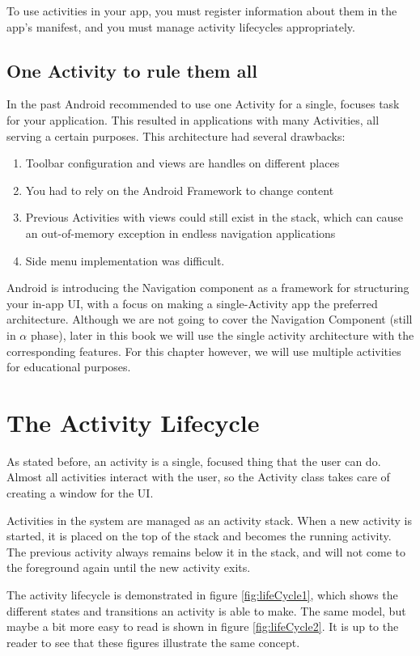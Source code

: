 To use activities in your app, you must register information about them in the app’s manifest, and you must manage activity lifecycles appropriately.

\subsection{One Activity to rule them all}
\label{sec:oneactivity}
In the past Android recommended to use one Activity for a single, focuses task for your application.
This resulted in applications with many Activities, all serving a certain purposes.
This architecture had several drawbacks:

\begin{enumerate}
	\item Toolbar configuration and views are handles on different places
	\item You had to rely on the Android Framework to change content
	\item Previous Activities with views could still exist in the stack, which can cause an out-of-memory exception in endless navigation applications
	\item Side menu implementation was difficult.
\end{enumerate}

Android is introducing the Navigation component as a framework for structuring your in-app UI, with a focus on making a single-Activity app the preferred architecture.
Although we are not going to cover the Navigation Component (still in $\alpha$ phase), later in this book we will use the single activity architecture with the corresponding features.
For this chapter however, we will use multiple activities for educational purposes.

\section{The Activity Lifecycle}
As stated before, an activity is a single, focused thing that the user can do.
Almost all activities interact with the user, so the Activity class takes care of creating a window for the UI.

Activities in the system are managed as an activity stack.
When a new activity is started, it is placed on the top of the stack and becomes the running activity.
The previous activity always remains below it in the stack, and will not come to the foreground again until the new activity exits.

The activity lifecycle is demonstrated in figure \ref{fig:lifeCycle1}, which shows the different states and transitions an activity is able to make.
The same model, but maybe a bit more easy to read is shown in figure \ref{fig:lifeCycle2}.
It is up to the reader to see that these figures illustrate the same concept.

